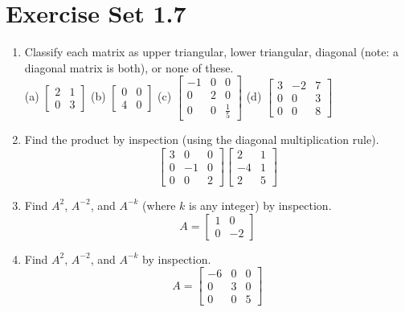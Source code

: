 \documentclass{article}
\theoremstyle{mystyle}
\begin{document}
\section*{Exercise Set 1.7}
\begin{enumerate}
    \item[1.] Classify each matrix as upper triangular, lower triangular, diagonal (note: a diagonal matrix is both), or none of these.\\[2pt]
    (a) $\begin{bmatrix}2&1\\0&3\end{bmatrix}$\quad
    (b) $\begin{bmatrix}0&0\\4&0\end{bmatrix}$\quad
    (c) $\begin{bmatrix}-1&0&0\\0&2&0\\0&0&\frac{1}{5}\end{bmatrix}$\quad
    (d) $\begin{bmatrix}3&-2&7\\0&0&3\\0&0&8\end{bmatrix}$

    \item[3.] Find the product by inspection (using the diagonal multiplication rule).
    \[
    \begin{bmatrix}3&0&0\\0&-1&0\\0&0&2\end{bmatrix}\begin{bmatrix}2&1\\-4&1\\2&5\end{bmatrix}
    \]

    \item[7.] Find $A^2$, $A^{-2}$, and $A^{-k}$ (where $k$ is any integer) by inspection.
    \[
    A=\begin{bmatrix}1&0\\0&-2\end{bmatrix}
    \]

    \item[8.] Find $A^2$, $A^{-2}$, and $A^{-k}$ by inspection.
    \[
    A=\begin{bmatrix}-6&0&0\\0&3&0\\0&0&5\end{bmatrix}
    \]


\end{enumerate}
\end{document}
